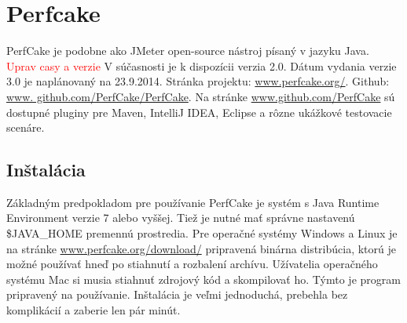 \documentclass[12pt,oneside,final]{fithesis-utf8}
\newcommand\todo[1]{\textcolor{red}{#1}}
\begin{document}
\newpage
\section{Perfcake}
PerfCake je podobne ako JMeter open-source nástroj písaný v jazyku Java. \todo{Uprav casy a verzie} V súčasnosti je k dispozícii verzia 2.0. Dátum vydania verzie 3.0 je naplánovaný na 23.9.2014. Stránka projektu: \url{www.perfcake.org/}. Github: \url{www.	github.com/PerfCake/PerfCake}. Na stránke \url{www.github.com/PerfCake} sú dostupné pluginy pre Maven, IntelliJ IDEA, Eclipse a rôzne ukážkové testovacie scenáre. 

\subsection{Inštalácia}
Základným predpokladom pre používanie PerfCake je systém s Java Runtime Environment verzie 7 alebo vyššej. Tiež je nutné mať správne nastavenú \$JAVA\_{}HOME premennú prostredia. Pre operačné systémy Windows a Linux je na stránke \url{www.perfcake.org/download/} pripravená binárna distribúcia, ktorú je možné používať hneď po stiahnutí a rozbalení archívu. Užívatelia operačného systému Mac si musia stiahnuť zdrojový kód a skompilovať ho. Týmto je program pripravený na používanie. Inštalácia je veľmi jednoduchá, prebehla bez komplikácií a zaberie len pár minút.
\end{document}
